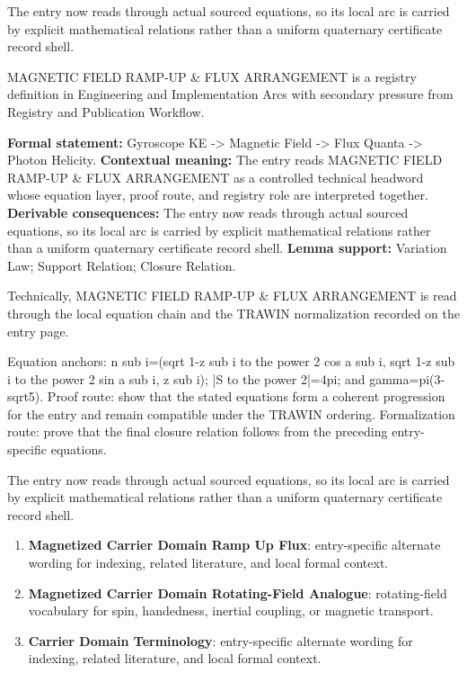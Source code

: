 The entry now reads through actual sourced equations, so its local arc is carried by explicit mathematical relations rather than a uniform quaternary certificate record shell.
\clearpage


\begingroup\small
{}
MAGNETIC FIELD RAMP-UP \& FLUX ARRANGEMENT is a registry definition in Engineering and Implementation Arcs with secondary pressure from Registry and Publication Workflow.

\begingroup\footnotesize\setlength{\emergencystretch}{3em}\sloppy
\textbf{Formal statement:} Gyroscope KE -> Magnetic Field -> Flux Quanta -> Photon Helicity. \textbf{Contextual meaning:} The entry reads MAGNETIC FIELD RAMP-UP \& FLUX ARRANGEMENT as a controlled technical headword whose equation layer, proof route, and registry role are interpreted together. \textbf{Derivable consequences:} The entry now reads through actual sourced equations, so its local arc is carried by explicit mathematical relations rather than a uniform quaternary certificate record shell. \textbf{Lemma support:} Variation Law; Support Relation; Closure Relation.\par
\endgroup

Technically, MAGNETIC FIELD RAMP-UP \& FLUX ARRANGEMENT is read through the local equation chain and the TRAWIN normalization recorded on the entry page.

Equation anchors: n sub i=(sqrt 1-z sub i to the power 2 cos a sub i, sqrt 1-z sub i to the power 2 sin a sub i, z sub i); |S to the power 2|=4pi; and gamma=pi(3-sqrt5). Proof route: show that the stated equations form a coherent progression for the entry and remain compatible under the TRAWIN ordering. Formalization route: prove that the final closure relation follows from the preceding entry-specific equations.

The entry now reads through actual sourced equations, so its local arc is carried by explicit mathematical relations rather than a uniform quaternary certificate record shell.
\endgroup

\begin{enumerate}[leftmargin=1.6em,itemsep=6pt,topsep=4pt]
\item \textbf{Magnetized Carrier Domain Ramp Up Flux}: entry-specific alternate wording for indexing, related literature, and local formal context.
\item \textbf{Magnetized Carrier Domain Rotating-Field Analogue}: rotating-field vocabulary for spin, handedness, inertial coupling, or magnetic transport.
\item \textbf{Carrier Domain Terminology}: entry-specific alternate wording for indexing, related literature, and local formal context.
\end{enumerate}

